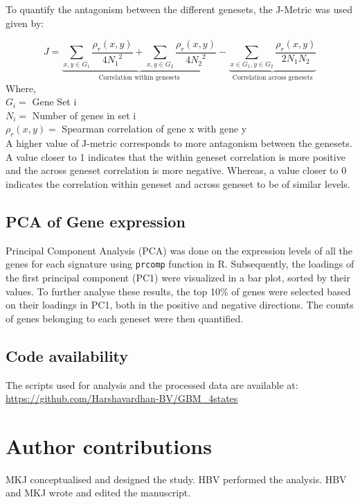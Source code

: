 \documentclass[11pt,a4paper]{article}
\begin{document}
To quantify the antagonism between the different genesets, the J-Metric \parencite{topojmetric} was used given by:

\begin{equation}
J = \underbrace{\sum_{x,y \in G_1} \frac{\rho_r(x,y)}{4 {N_1}^2} + \sum_{x,y \in G_2} \frac{\rho_r(x,y)}{4 {N_2}^2}}_{\text{Correlation within genesets}} - \underbrace{\sum_{x \in G_1, y \in G_2} \frac{\rho_r(x,y)}{2  N_1 N_2}}_{\text{Correlation across genesets}}
\label{jmetric_eqn}
\end{equation}
Where, \\
$G_i =$ Gene Set i\\
$N_i =$ Number of genes in set i\\
$\rho_r(x,y) =$ Spearman correlation of gene x with gene y\\

A higher value of J-metric corresponds to more antagonism between the genesets. A value closer to 1 indicates that the within geneset correlation is more positive and the across geneset correlation is more negative. Whereas, a value closer to 0 indicates the correlation within geneset and across geneset to be of similar levels.

\subsection{PCA of Gene expression}
Principal Component Analysis (PCA) was done on the expression levels of all the genes for each signature using \texttt{prcomp} function in R. Subsequently, the loadings of the first principal component (PC1) were visualized in a bar plot, sorted by their values. To further analyse these results, the top 10\% of genes were selected based on their loadings in PC1, both in the positive and negative directions. The counts of genes belonging to each geneset were then quantified.

\subsection{Code availability}
The scripts used for analysis and the processed data are available at:\\
\url{https://github.com/Harshavardhan-BV/GBM_4states}

\section{Author contributions}
MKJ conceptualised and designed the study. HBV performed the analysis. HBV and MKJ wrote and edited the manuscript.
\end{document}
